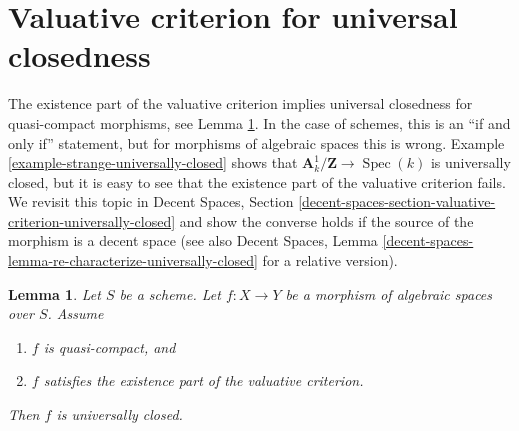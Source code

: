 \documentclass{stacks-project}
\theoremstyle{plain}
\newtheorem{lemma}[subsection]{Lemma}
\theoremstyle{definition}
\theoremstyle{remark}
\numberwithin{equation}{subsection}
\def\Spec{\mathop{\mathrm{Spec}}}
\begin{document}
\section{Valuative criterion for universal closedness}
\label{section-valuative-criterion-universally-closed}

\noindent
The existence part of the valuative criterion implies universal
closedness for quasi-compact morphisms, see
Lemma \ref{lemma-quasi-compact-existence-universally-closed}.
In the case of schemes, this is an ``if and only if'' statement,
but for morphisms of algebraic spaces this is wrong.
Example \ref{example-strange-universally-closed}
shows that $\mathbf{A}^1_k/\mathbf{Z} \to \Spec(k)$ is universally
closed, but it is easy to see that the existence part of
the valuative criterion fails. We revisit this topic in
Decent Spaces, Section
\ref{decent-spaces-section-valuative-criterion-universally-closed}
and show the converse holds if the source of the morphism is a decent space
(see also
Decent Spaces,
Lemma \ref{decent-spaces-lemma-re-characterize-universally-closed}
for a relative version).

\begin{lemma}
\label{lemma-quasi-compact-existence-universally-closed}
Let $S$ be a scheme.
Let $f : X \to Y$ be a morphism of algebraic spaces over $S$.
Assume
\begin{enumerate}
\item $f$ is quasi-compact, and
\item $f$ satisfies the existence part of the valuative criterion.
\end{enumerate}
Then $f$ is universally closed.
\end{lemma}
\end{document}
